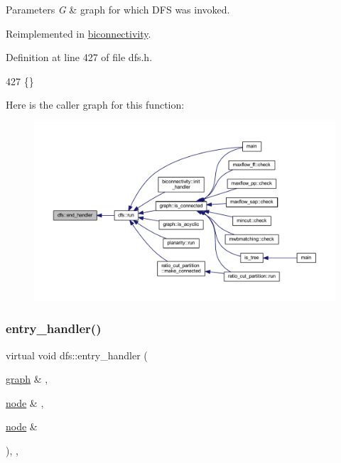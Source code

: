 \begin{DoxyParams}{Parameters}
{\em G} & graph for which D\+FS was invoked. \\
\hline
\end{DoxyParams}


Reimplemented in \mbox{\hyperlink{classbiconnectivity_a2583331a4561f3db221ab674d2e5d75e}{biconnectivity}}.



Definition at line 427 of file dfs.\+h.


\begin{DoxyCode}
427 \{\}
\end{DoxyCode}
Here is the caller graph for this function\+:
\nopagebreak
\begin{figure}[H]
\begin{center}
\leavevmode
\includegraphics[width=350pt]{classdfs_a59c512fa99ad3809db3e24347ab43b85_icgraph}
\end{center}
\end{figure}
\mbox{\label{classdfs_a6473b0a5d792d9e45c3d32dfdc5b5ffc}} 
\subsubsection{\texorpdfstring{entry\+\_\+handler()}{entry\_handler()}}
{\footnotesize\ttfamily virtual void dfs\+::entry\+\_\+handler (\begin{DoxyParamCaption}\item[{\mbox{\hyperlink{classgraph}{graph}} \&}]{,  }\item[{\mbox{\hyperlink{classnode}{node}} \&}]{,  }\item[{\mbox{\hyperlink{classnode}{node}} \&}]{ }\end{DoxyParamCaption})\hspace{0.3cm}{\ttfamily [inline]}, {\ttfamily [virtual]}, {\ttfamily [inherited]}}



